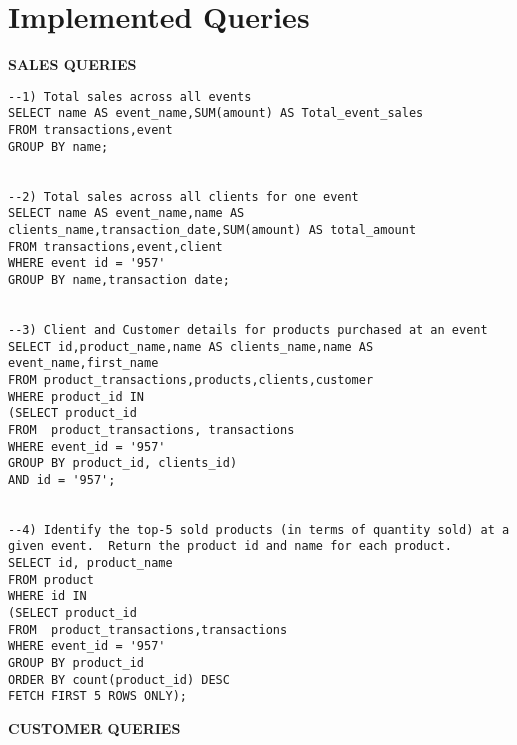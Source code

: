 \newpage
\section{Implemented Queries}
{\Large\textbf{SALES QUERIES}\par}
\begin{lstlisting}
--1) Total sales across all events
SELECT name AS event_name,SUM(amount) AS Total_event_sales
FROM transactions,event
GROUP BY name;


--2) Total sales across all clients for one event
SELECT name AS event_name,name AS clients_name,transaction_date,SUM(amount) AS total_amount
FROM transactions,event,client
WHERE event id = '957'
GROUP BY name,transaction date;


--3) Client and Customer details for products purchased at an event
SELECT id,product_name,name AS clients_name,name AS event_name,first_name
FROM product_transactions,products,clients,customer
WHERE product_id IN
(SELECT product_id
FROM  product_transactions, transactions
WHERE event_id = '957'
GROUP BY product_id, clients_id)
AND id = '957';


--4) Identify the top-5 sold products (in terms of quantity sold) at a given event.  Return the product id and name for each product.
SELECT id, product_name
FROM product
WHERE id IN
(SELECT product_id
FROM  product_transactions,transactions
WHERE event_id = '957'
GROUP BY product_id
ORDER BY count(product_id) DESC
FETCH FIRST 5 ROWS ONLY);
\end{lstlisting}
{\Large \textbf{CUSTOMER QUERIES}}
